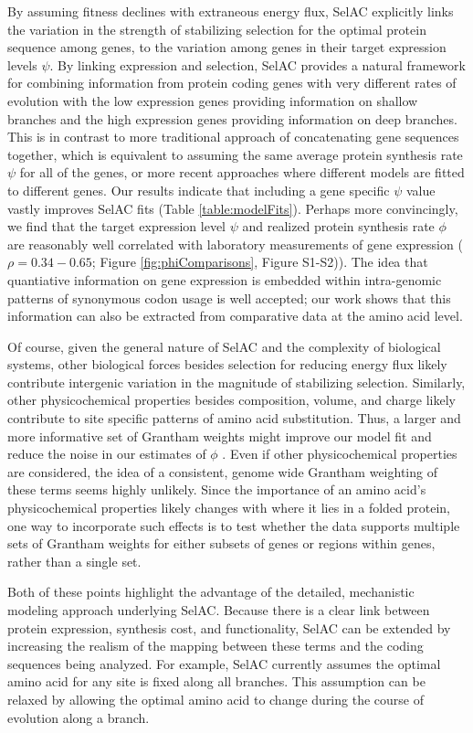 \documentclass{article}
\newcommand{\selac}{SelAC\xspace}
\begin{document}
By assuming fitness declines with extraneous energy flux, \selac explicitly links the variation in the strength of stabilizing selection for the optimal protein sequence among genes, to the variation among genes in their target expression levels $\psi$.
By linking expression and selection, \selac provides a natural framework for combining information from protein coding genes with very different rates of evolution with the low expression genes providing information on shallow branches and the high expression genes providing information on deep branches.
This is in contrast to more traditional approach of concatenating gene sequences together, which is equivalent to assuming the same average protein synthesis rate $\psi$ for all of the genes, or more recent approaches where different models are fitted to different genes.
Our results indicate that including a gene specific $\psi$ value vastly improves \selac fits (Table \ref{table:modelFits}).
Perhaps more convincingly, we find that the target expression level $\psi$ and realized protein synthesis rate $\phi$ are reasonably well correlated with laboratory measurements of gene expression ($\rho = 0.34-0.65$; Figure \ref{fig:phiComparisons}, Figure S1-S2)).
The idea that quantiative information on gene expression is embedded within intra-genomic patterns of synonymous codon usage is well accepted; our work shows that this information can also be extracted from comparative data at the amino acid level.

Of course, given the general nature of \selac and the complexity of biological systems, other biological forces besides selection for reducing energy flux likely contribute intergenic variation in the magnitude of stabilizing selection.
Similarly, other physicochemical properties besides composition, volume, and charge likely contribute to site specific patterns of amino acid substitution. %
Thus, a larger and more informative set of Grantham weights might improve our model fit and reduce the noise in our estimates of $\phi$ .
Even if other physicochemical properties are considered, the idea of a consistent, genome wide Grantham weighting of these terms seems highly unlikely.
Since the importance of an amino acid's physicochemical properties likely changes with where it lies in a folded protein, one way to incorporate such effects is to test whether the data supports multiple sets of Grantham weights for either subsets of genes or regions within genes, rather than a single set.

Both of these points highlight the advantage of the detailed, mechanistic modeling approach underlying \selac.
Because there is a clear link between protein expression, synthesis cost, and functionality, \selac can be extended by increasing the realism of the mapping between these terms and the coding sequences being analyzed.
For example, \selac currently assumes the optimal amino acid for any site is fixed along all branches.
This assumption can be relaxed by allowing the optimal amino acid to change during the course of evolution along a branch.
\end{document}
